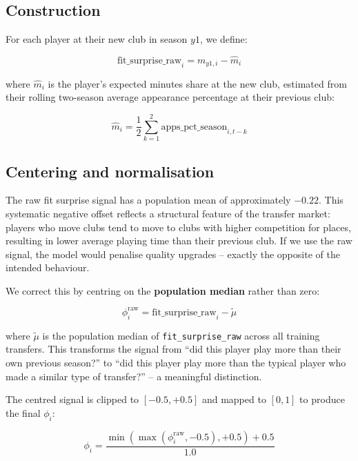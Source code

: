 \documentclass[12pt, a4paper, oneside]{report}
\begin{document}
\subsection{Construction}

For each player at their new club in season $y1$, we define:

\begin{equation}
\label{eq:fit_surprise_raw}
\text{fit\_surprise\_raw}_i = m_{y1,i} - \hat{m}_{i}
\end{equation}

where $\hat{m}_{i}$ is the player's expected minutes share at the new club, estimated from their rolling two-season average appearance percentage at their previous club:

\begin{equation}
\hat{m}_{i} = \frac{1}{2} \sum_{k=1}^{2} \text{apps\_pct\_season}_{i, t-k}
\end{equation}

\subsection{Centering and normalisation}

The raw fit surprise signal has a population mean of approximately $-0.22$. This systematic negative offset reflects a structural feature of the transfer market: players who move clubs tend to move to clubs with higher competition for places, resulting in lower average playing time than their previous club. If we use the raw signal, the model would penalise quality upgrades -- exactly the opposite of the intended behaviour.

We correct this by centring on the \textbf{population median} rather than zero:

\begin{equation}
\label{eq:fit_surprise_centred}
\phi_{i}^{\text{raw}} = \text{fit\_surprise\_raw}_i - \tilde{\mu}
\end{equation}

where $\tilde{\mu}$ is the population median of \texttt{fit\_surprise\_raw} across all training transfers. This transforms the signal from ``did this player play more than their own previous season?'' to ``did this player play more than the typical player who made a similar type of transfer?'' -- a meaningful distinction.

The centred signal is clipped to $[-0.5, +0.5]$ and mapped to $[0, 1]$ to produce the final $\phi_i$:

\begin{equation}
\label{eq:fit_surprise_final}
\phi_i = \frac{\min(\max(\phi_{i}^{\text{raw}}, -0.5), +0.5) + 0.5}{1.0}
\end{equation}
\end{document}
